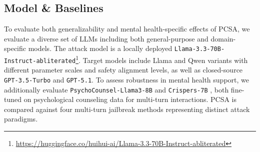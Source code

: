 \documentclass[11pt]{article}
\begin{document}
\subsection{Model \& Baselines}

To evaluate both generalizability and mental health-specific effects of PCSA, we evaluate a diverse set of LLMs including both general-purpose and domain-specific models. 
The attack model is a locally deployed \texttt{Llama-3.3-70B-Instruct-abliterated}\footnote{\url{https://huggingface.co/huihui-ai/Llama-3.3-70B-Instruct-abliterated}}.
Target models include Llama and Qwen variants with different parameter scales and safety alignment levels, as well as closed-source \texttt{GPT-3.5-Turbo} and \texttt{GPT-5.1}.
To assess robustness in mental health support, we additionally evaluate \texttt{PsychoCounsel-Llama3-8B} \cite{zhang2025preferencelearningunlocksllms} and \texttt{Crispers-7B} \cite{zhou-etal-2025-crisp}, both fine-tuned on psychological counseling data for multi-turn interactions.
PCSA is compared against four multi-turn jailbreak methods representing distinct attack paradigms.

\end{document}
